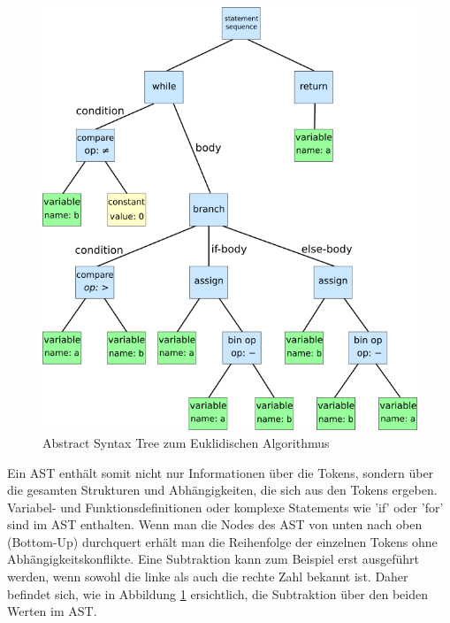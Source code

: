 \begin{figure}[H]
    \centering
    \includegraphics[scale=0.3]{resources/images/syntaxtree.svg.png}
    \caption[Abstract Syntax Tree (https://en.wikipedia.org/wiki/Abstract\_syntax\_tree, besucht am 5.8.2024)]{Abstract Syntax Tree zum Euklidischen Algorithmus}
    \label{fig:syntax-tree}
\end{figure}

Ein AST enthält somit nicht nur Informationen über die Tokens, sondern über die gesamten Strukturen und Abhängigkeiten, die sich aus den Tokens ergeben. Variabel- und Funktionsdefinitionen oder komplexe Statements wie 'if' oder 'for'
sind im AST enthalten. Wenn man die Nodes des AST von unten nach oben (Bottom-Up) durchquert erhält man die Reihenfolge der einzelnen Tokens ohne Abhängigkeitskonflikte. Eine Subtraktion kann zum Beispiel erst ausgeführt werden,
wenn sowohl die linke als auch die rechte Zahl bekannt ist. Daher befindet sich, wie in Abbildung \ref{fig:syntax-tree} ersichtlich, die Subtraktion über den beiden Werten im AST.

